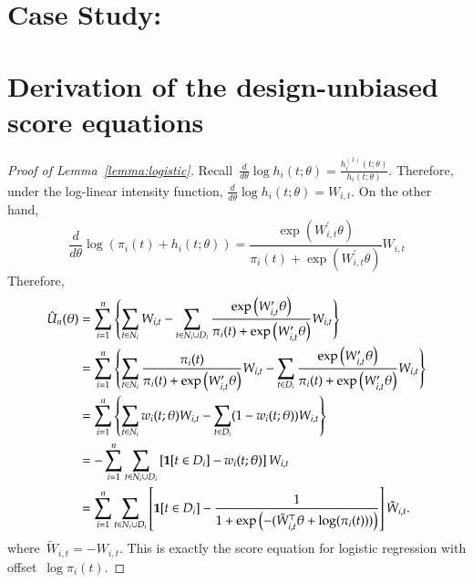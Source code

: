 \documentclass[11pt]{amsart}
\begin{document}
\section{Case Study: }




\appendix

\section{Derivation of the design-unbiased score equations}

\begin{proof}[Proof of Lemma~\ref{lemma:logistic}]
Recall~$\frac{d}{d\theta} \log h_i (t; \theta) = \frac{h^{(1)}_i (t;
  \theta)}{h_i (t; \theta)}$. Therefore, under the log-linear
intensity function, $\frac{d}{d\theta} \log h_i (t; \theta) =
W_{i,t}$. On the other hand,
\[
\frac{d}{d \theta} \log \left( \pi_i (t) + h_i (t;\theta) \right) = 
\frac{\exp \left( W_{i,t}^\prime \theta \right)}{\pi_i (t) + \exp
  \left( W_{i,t}^\prime \theta \right)} W_{i,t}
\]
Therefore,
\begin{align*}
\hat U_n (\theta) 
  &= \sum_{i=1}^n \left \{ \sum_{t \in N_i} W_{i,t} -
    \sum_{t \in N_i \cup D_i} \frac{\exp \left( W_{i,t}^\prime \theta
    \right)}{\pi_i (t) + \exp \left( W_{i,t}^\prime \theta \right)}
    W_{i,t} \right \} \\
  &= \sum_{i=1}^n \left \{ \sum_{t \in N_i} \frac{\pi_i (t)}{\pi_i (t)
    + \exp \left( W_{i,t}^\prime \theta \right)} W_{i,t} -
    \sum_{t \in D_i} \frac{\exp \left( W_{i,t}^\prime \theta
    \right)}{\pi_i (t) + \exp \left( W_{i,t}^\prime \theta \right)}
    W_{i,t} \right \} \\
  &= \sum_{i=1}^n \left \{ \sum_{t \in N_i} w_{i} (t; \theta) W_{i,t} -
    \sum_{t \in D_i} (1 - w_i (t; \theta)) W_{i,t} \right \} \\
  &= - \sum_{i=1}^n \sum_{t \in N_i \cup D_i} \left[ {\bf 1} [t \in
    D_i]  - w_{i} (t; \theta) \right] W_{i,t} \\
  &= \sum_{i=1}^n \sum_{t \in N_i \cup D_i}
    \left[ {\bf 1} [t \in D_i]  - \frac{1}{1 + \exp\left( - (
          \tilde W_{i,t}^\top \theta + \log (\pi_i (t) ) ) \right)}
    \right] \tilde W_{i,t}.
\end{align*}
where~$\tilde W_{i,t} = - W_{i,t}$. This is exactly the score equation
for logistic regression with offset~$\log \pi_i (t)$.
\end{proof}
\end{document}
